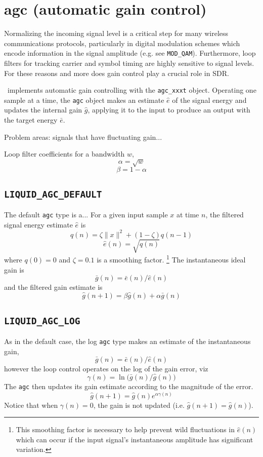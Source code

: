 % 
%

\section{agc (automatic gain control)}
\label{module:agc}
Normalizing the incoming signal level is a critical step for many wireless
communications protocols, particularly in digital modulation schemes which
encode information in the signal amplitude (e.g. see {\tt MOD\_QAM}).
Furthermore, loop filters for tracking carrier and symbol timing are highly
sensitive to signal levels.
For these reasons and more does gain control play a crucial role in SDR.

\liquid\ implements automatic gain controlling with the {\tt agc\_xxxt}
object.
Operating one sample at a time, the {\tt agc} object makes an estimate
$\hat{e}$ of the signal energy and updates the internal gain $\hat{g}$,
applying it to the input to produce an output with the target energy
$\bar{e}$.

Problem areas: signals that have fluctuating gain...

Loop filter coefficients for a bandwidth $w$,
\[  \alpha = \sqrt{w}   \]
\[  \beta = 1 - \alpha  \]

\subsection{{\tt LIQUID\_AGC\_DEFAULT}}
The default {\tt agc} type is a... For a given input sample $x$ at time $n$,
the filtered signal energy estimate $\hat{e}$ is
\[  q(n) = \zeta\|x\|^2 + (1-\zeta)q(n-1)   \]
\[  \hat{e}(n) = \sqrt{q(n)}                \]
where $q(0)=0$ and $\zeta=0.1$ is a smoothing factor.%
\footnote{This smoothing factor is necessary to help prevent wild fluctuations
in $\hat{e}(n)$ which can occur if the input signal's instantaneous amplitude
has significant variation.}
The instantaneous ideal gain is
\[
    \bar{g}(n) = \bar{e}(n) / \hat{e}(n)
\]
and the filtered gain estimate is
\[
    \hat{g}(n+1) = \beta \hat{g}(n) + \alpha \bar{g}(n)
\]

\subsection{{\tt LIQUID\_AGC\_LOG}}
As in the default case, the log {\tt agc} type makes an estimate of the
instantaneous gain,
\[
    \bar{g}(n) = \bar{e}(n) / \hat{e}(n)
\]
however the loop control operates on the log of the gain error, viz
\[
    \gamma(n) = \ln\bigl( \bar{g}(n) / \hat{g}(n) \bigr)
\]
The {\tt agc} then updates its gain estimate according to the magnitude of the
error.
\[
    \hat{g}(n+1) = \hat{g}(n) e^{ \alpha \gamma(n) }
\]
Notice that when $\gamma(n)=0$, the gain is not updated
(i.e. $\hat{g}(n+1) = \hat{g}(n)$).



